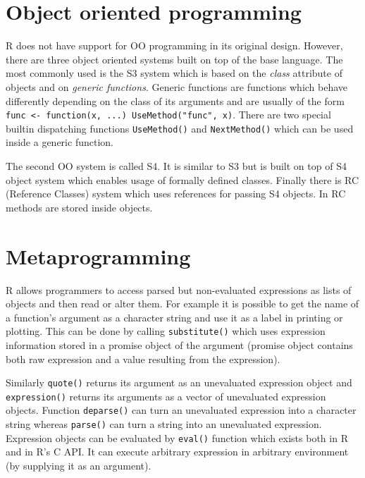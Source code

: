 \documentclass[thesis=M,english,hidelinks]{FITthesis}[2012/10/20]
\begin{document}
	\section{Object oriented programming}
	R does not have support for OO programming in its original design. However, there are three object oriented systems built on top of the base language. The most commonly used is the S3 system which is based on the \emph{class} attribute of objects and on \emph{generic functions}. Generic functions are functions which behave differently depending on the class of its arguments and are usually of the form \lstinline|func <- function(x, ...) UseMethod("func", x)|. There are two special builtin dispatching functions \lstinline|UseMethod()| and \lstinline|NextMethod()| which can be used inside a generic function.\par
	
	The second OO system is called S4. It is similar to S3 but is built on top of S4 object system which enables usage of formally defined classes. Finally there is RC (Reference Classes) system which uses references for passing S4 objects. In RC methods are stored inside objects.\par
	
	\section{Metaprogramming}
	R allows programmers to access parsed but non-evaluated expressions as lists of objects and then read or alter them. For example it is possible to get the name of a function's argument as a character string and use it as a label in printing or plotting. This can be done by calling \lstinline|substitute()| which uses expression information stored in a promise object of the argument (promise object contains both raw expression and a value resulting from the expression).\par
	
	Similarly \lstinline|quote()| returns its argument as an unevaluated expression object and \lstinline|expression()| returns its arguments as a vector of unevaluated expression objects. Function \lstinline|deparse()| can turn an unevaluated expression into a character string whereas \lstinline|parse()| can turn a string into an unevaluated expression. Expression objects can be evaluated by \lstinline|eval()| function which exists both in R and in R's C API. It can execute arbitrary expression in arbitrary environment (by supplying it as an argument).\par
	
\end{document}
